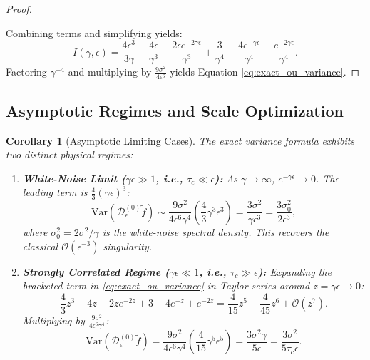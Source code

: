 \documentclass[11pt,a4paper]{article}
\newtheorem{corollary}[theorem]{Corollary}
\theoremstyle{definition}
\begin{document}
\begin{proof}
\begin{enumerate}
\end{enumerate}
Combining terms and simplifying yields:
\begin{equation}
I(\gamma, \epsilon) = \frac{4\epsilon^3}{3\gamma} - \frac{4\epsilon}{\gamma^3} + \frac{2\epsilon e^{-2\gamma \epsilon}}{\gamma^3} + \frac{3}{\gamma^4} - \frac{4e^{-\gamma \epsilon}}{\gamma^4} + \frac{e^{-2\gamma \epsilon}}{\gamma^4}.
\end{equation}
Factoring $\gamma^{-4}$ and multiplying by $\frac{9\sigma^2}{4\epsilon^6}$ yields Equation \eqref{eq:exact_ou_variance}.
\end{proof}

\subsection{Asymptotic Regimes and Scale Optimization}

\begin{corollary}[Asymptotic Limiting Cases]
The exact variance formula exhibits two distinct physical regimes:
\begin{enumerate}
    \item \textbf{White-Noise Limit ($\gamma \epsilon \gg 1$, i.e., $\tau_c \ll \epsilon$):}
    As $\gamma \to \infty$, $e^{-\gamma \epsilon} \to 0$. The leading term is $\frac{4}{3}(\gamma \epsilon)^3$:
    \begin{equation}
    \text{Var}(\mathcal{D}_\epsilon^{(0)}\tilde{f}) \sim \frac{9\sigma^2}{4\epsilon^6 \gamma^4} \left( \frac{4}{3} \gamma^3 \epsilon^3 \right) = \frac{3\sigma^2}{\gamma \epsilon^3} = \frac{3 \sigma_0^2}{2 \epsilon^3},
    \end{equation}
    where $\sigma_0^2 = 2\sigma^2 / \gamma$ is the white-noise spectral density. This recovers the classical $\mathcal{O}(\epsilon^{-3})$ singularity.
    \item \textbf{Strongly Correlated Regime ($\gamma \epsilon \ll 1$, i.e., $\tau_c \gg \epsilon$):}
    Expanding the bracketed term in \eqref{eq:exact_ou_variance} in Taylor series around $z = \gamma \epsilon \to 0$:
    \begin{equation}
    \frac{4}{3}z^3 - 4z + 2z e^{-2z} + 3 - 4e^{-z} + e^{-2z} = \frac{4}{15} z^5 - \frac{4}{45} z^6 + \mathcal{O}(z^7).
    \end{equation}
    Multiplying by $\frac{9\sigma^2}{4\epsilon^6 \gamma^4}$:
    \begin{equation}
    \text{Var}\left(\mathcal{D}_\epsilon^{(0)}\tilde{f}\right) = \frac{9\sigma^2}{4\epsilon^6 \gamma^4} \left( \frac{4}{15} \gamma^5 \epsilon^5 \right) = \frac{3\sigma^2 \gamma}{5\epsilon} = \frac{3 \sigma^2}{5 \tau_c \epsilon}.
    \label{eq:correlated_variance_rate}
    \end{equation}
\end{enumerate}
\end{corollary}
\end{document}
